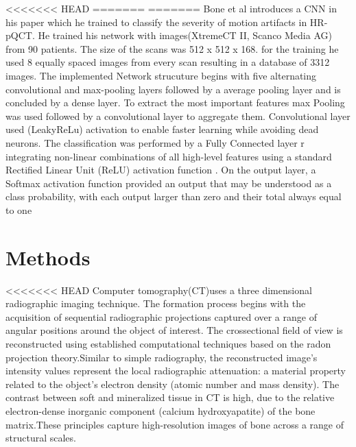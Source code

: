 \documentclass[
a4paper, 
12pt,
grayscalebody, %
abstract=on,
twoside, BCOR10mm, 12pt, DIV13,headinclude, footexclude, final, abstracton, openright
]{ibireprt}
\numberwithin{equation}{chapter}
\numberwithin{table}{chapter}
\numberwithin{figure}{chapter}
\numberwithin{algorithm}{chapter}
\numberwithin{example}{chapter}
\numberwithin{example}{chapter}
\begin{document}
<<<<<<< HEAD
=======
=======
Bone et al introduces a CNN in his paper which he trained to classify the severity of motion artifacts in HR-pQCT. He trained his network with images(XtremeCT II, Scanco Media AG) from 90 patients. The size of the scans was 512 x 512 x 168. for the training he used 8 equally spaced images from every scan  resulting in a database of 3312 images.
The implemented Network strucuture begins with five alternating convolutional and max-pooling layers followed by a average pooling layer and is concluded by a dense layer. To extract the most important features max Pooling was used followed by a convolutional layer to aggregate them. Convolutional layer used (LeakyReLu) activation to enable faster learning while avoiding dead neurons.
 The classification was performed by a Fully Connected layer r integrating non-linear combinations of all high-level features using a standard Rectified Linear
Unit (ReLU) activation function . On the output layer, a Softmax activation function provided an output that may be understood as a class probability, with each output larger than zero and their total always equal to one

\chapter{Methods}
<<<<<<< HEAD
Computer tomography(CT)uses a three dimensional radiographic imaging technique. The formation process begins with the acquisition of sequential radiographic projections captured over a range of angular positions around the object of interest. The crossectional field of view is reconstructed using established computational techniques based on the radon projection theory\cite{article}.Similar to simple radiography, the reconstructed image’s intensity values represent the local radiographic attenuation: a material property related to the object’s electron density (atomic number and mass density). The contrast between soft and mineralized tissue in CT is high, due to the relative electron-dense inorganic component (calcium hydroxyapatite) of the bone matrix.These principles capture high-resolution images of bone
across a range of structural scales. %
\end{document}
